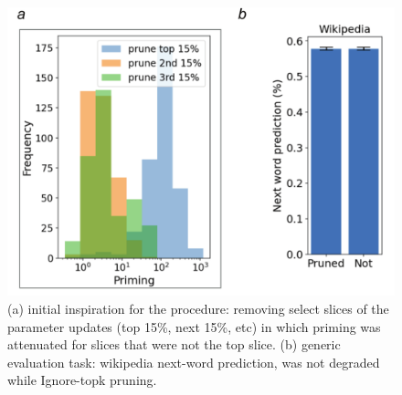\documentclass[11pt, a4paper, logo, copyright]{googledeepmind}
\theoremstyle{plain}
\theoremstyle{definition}
\theoremstyle{remark}
\begin{document}
\begin{figure}[h]
\vspace{0mm}
    \centering \includegraphics[scale=.30,clip]{figures/initial_inspiration.pdf}
    \vspace{-1mm}
    \caption{(a) initial inspiration for the procedure: removing select slices of the parameter updates (top 15\%, next 15\%, etc) in which priming was attenuated for slices that were not the top slice. (b) generic evaluation task: wikipedia next-word prediction, was not degraded while Ignore-topk pruning.} \label{fig:Pruning_initial_inspiration}
  \vspace{-0mm}
\end{figure}
\end{document}
